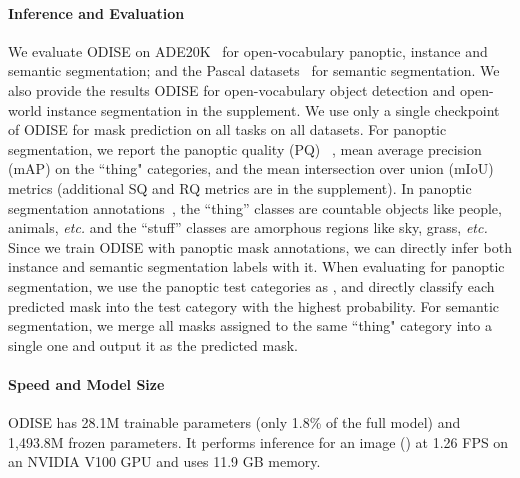 \documentclass[10pt,twocolumn,letterpaper]{article}
\newcommand{\ourmethod}{ODISE}
\begin{document}
\paragraph{Inference and Evaluation} 
We evaluate \ourmethod{} on ADE20K~\cite{zhou2019ade} for open-vocabulary panoptic, instance and semantic segmentation; and the Pascal datasets~\cite{everingham2010pascal, mottaghi2014ctx} for semantic segmentation. We also provide the results \ourmethod{} for open-vocabulary object detection and open-world instance segmentation in the supplement. We use only a single checkpoint of \ourmethod{} for mask prediction on all tasks on all datasets. For panoptic segmentation, we report the panoptic quality (PQ) ~\cite{kirillov2019panoptic}, mean average precision (mAP) on the ``thing" categories, and the mean intersection over union (mIoU) metrics (additional SQ and RQ metrics are in the supplement). In panoptic segmentation annotations~\cite{kirillov2019panoptic}, the ``thing'' classes are countable objects like people, animals, \textit{etc.} and the ``stuff'' classes are amorphous regions like sky, grass, \textit{etc.}
Since we train \ourmethod{} with panoptic mask annotations, we can directly infer both instance and semantic segmentation labels with it. 
When evaluating for panoptic segmentation, we use the panoptic test categories as , and directly classify each predicted mask into the test category with the highest probability. 
For semantic segmentation, we merge all masks assigned to the same ``thing" category into a single one and output it as the predicted mask.

\paragraph{Speed and Model Size}
\ourmethod{} has 28.1M trainable parameters (only 1.8\% of the full model) and 1,493.8M frozen parameters. It performs inference for an image () at 1.26 FPS on an NVIDIA V100 GPU and uses 11.9 GB memory. 
\end{document}
